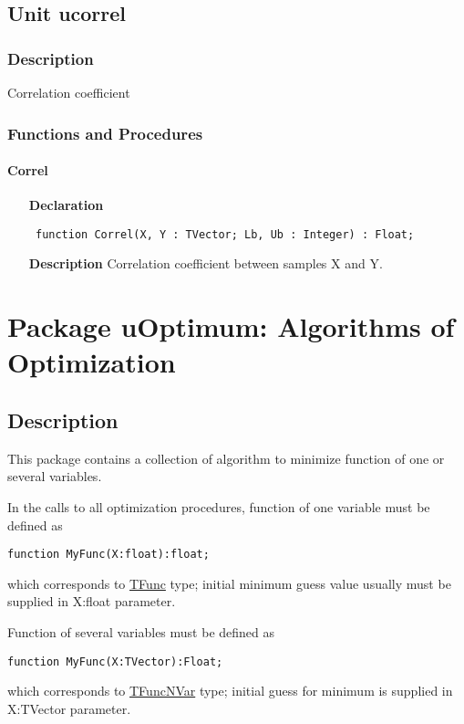 \documentclass[12pt,a4paper,oneside]{report}
\newcommand{\declarationitem}[1]{\textbf{#1}}
\newcommand{\descriptiontitle}[1]{\textbf{#1}}
\newcommand{\code}[1]{\texttt{#1}}
\begin{document}
\section{Unit ucorrel}
\label{ucorrel}
\subsection{Description}
Correlation coefficient
\subsection{Functions and Procedures}
\subsubsection{Correl}
\label{ucorrel-Correl}
\begin{itemize}\item[\declarationitem{Declaration}\hfill]
	\begin{flushleft}
		\code{
			function Correl(X, Y : TVector; Lb, Ub : Integer) : Float;}
	\end{flushleft}
	\item[\descriptiontitle{Description}]
	Correlation coefficient between samples X and Y.
\end{itemize}
\chapter{Package uOptimum: Algorithms of \\ Optimization }\label{package-uoptimum}
\section{Description}
This package contains a collection of algorithm to minimize function of one or several variables. 

\noindent In the calls to all optimization procedures, function of one variable must be defined as 

\code{function MyFunc(X:float):float;} 

\noindent which corresponds to \hyperref[utypes-TFunc]{TFunc} type; initial minimum guess value usually must be supplied in X:float parameter.

\noindent Function of several variables must be defined as 

\code{function MyFunc(X:TVector):Float;}

\noindent which corresponds to \hyperref[utypes-TFuncNVar]{TFuncNVar} type; initial guess for minimum is supplied in X:TVector parameter.
\end{document}
